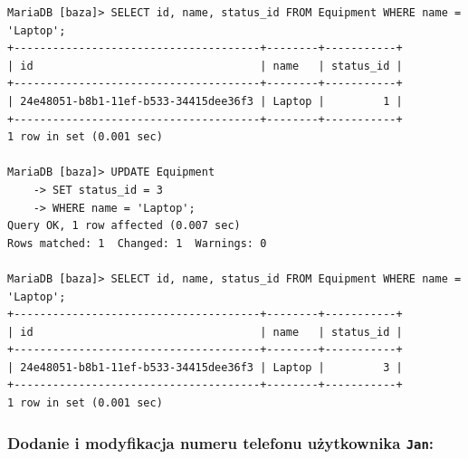 \documentclass{article}
\begin{document}
\begin{verbatim}
MariaDB [baza]> SELECT id, name, status_id FROM Equipment WHERE name = 'Laptop';
+--------------------------------------+--------+-----------+
| id                                   | name   | status_id |
+--------------------------------------+--------+-----------+
| 24e48051-b8b1-11ef-b533-34415dee36f3 | Laptop |         1 |
+--------------------------------------+--------+-----------+
1 row in set (0.001 sec)

MariaDB [baza]> UPDATE Equipment
    -> SET status_id = 3
    -> WHERE name = 'Laptop';
Query OK, 1 row affected (0.007 sec)
Rows matched: 1  Changed: 1  Warnings: 0

MariaDB [baza]> SELECT id, name, status_id FROM Equipment WHERE name = 'Laptop';
+--------------------------------------+--------+-----------+
| id                                   | name   | status_id |
+--------------------------------------+--------+-----------+
| 24e48051-b8b1-11ef-b533-34415dee36f3 | Laptop |         3 |
+--------------------------------------+--------+-----------+
1 row in set (0.001 sec)
\end{verbatim}

\subsubsection*{Dodanie i modyfikacja numeru telefonu użytkownika \texttt{Jan}:}
\end{document}

